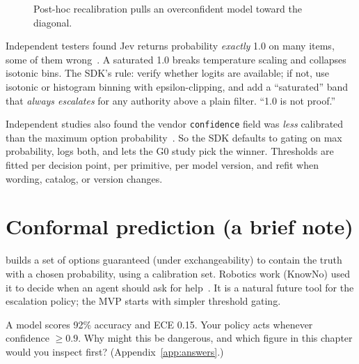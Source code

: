 \begin{figure}[h]\centering
{}
\caption{Post-hoc recalibration pulls an overconfident model toward the diagonal.~\citep{jev_calibration_anthus}}
\label{fig:recal}
\end{figure}

\begin{pitfall}
Independent testers found Jev returns probability \emph{exactly} 1.0 on many items, some of
them wrong~\citep{jev_baselines_eval}. A saturated 1.0 breaks temperature scaling and
collapses isotonic bins. The SDK's rule: verify whether logits are available; if not, use
isotonic or histogram binning with epsilon-clipping, and add a ``saturated'' band that
\emph{always escalates} for any authority above a plain filter. ``1.0 is not proof.''
\end{pitfall}

\begin{whyhere}
Independent studies also found the vendor \texttt{confidence} field was \emph{less}
calibrated than the maximum option probability~\citep{jev_ood_calibration}. So the SDK
defaults to gating on max probability, logs both, and lets the G0 study pick the winner.
Thresholds are fitted per decision point, per primitive, per model version, and refit when
wording, catalog, or version changes.
\end{whyhere}

\section{Conformal prediction (a brief note)}

 builds a set of options guaranteed (under exchangeability) to
contain the truth with a chosen probability, using a calibration set. Robotics work
(KnowNo) used it to decide when an agent should ask for help~\citep{knowno}. It is a natural
future tool for the escalation policy; the MVP starts with simpler threshold gating.

\begin{checkbox}
A model scores 92\% accuracy and ECE 0.15. Your policy acts whenever confidence
$\ge 0.9$. Why might this be dangerous, and which figure in this chapter would you inspect
first? (Appendix~\ref{app:answers}.)
\end{checkbox}
